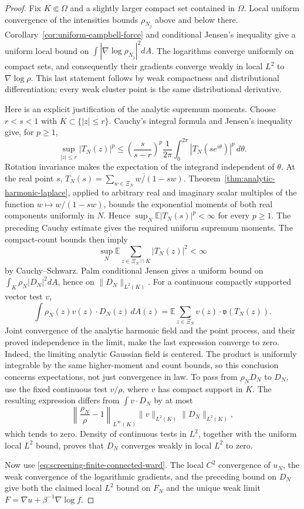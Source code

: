 \documentclass[11pt,a4paper]{article}
\numberwithin{equation}{section}
\theoremstyle{definition}
\theoremstyle{remark}
\begin{document}
\begin{proof}
Fix $K\Subset\Omega$ and a slightly larger compact set contained in
$\Omega$. Local uniform convergence of the intensities bounds
$\rho_{N_j}$ above and below there. Corollary~\ref{cor:uniform-campbell-force} and conditional
Jensen's inequality give a uniform local bound on
$\int |\nabla\log\rho_{N_j}|^2dA$. The logarithms converge uniformly
on compact sets, and consequently their gradients converge weakly in
local $L^2$ to $\nabla\log\rho$. This last statement follows by weak
compactness and distributional differentiation; every weak cluster
point is the same distributional derivative.

Here is an explicit justification of the analytic supremum moments.
Choose $r<s<1$ with $K\subset\{|z|\le r\}$. Cauchy's integral
formula and Jensen's inequality give, for $p\ge1$,
\[
 \sup_{|z|\le r}|T_N(z)|^p
 \le\left(\frac{s}{s-r}\right)^p
          \frac1{2\pi}\int_0^{2\pi}|T_N(se^{i\theta})|^p\,d\theta.
\]
Rotation invariance makes the expectation of the integrand independent
of $\theta$. At the real point $s$,
$T_N(s)=\overline{\sum_{w\in\Xi_N} w/(1-sw)}$.
Theorem~\ref{thm:analytic-harmonic-laplace}, applied to arbitrary real
and imaginary scalar multiples of the function $w\mapsto w/(1-sw)$,
bounds the exponential moments of both real components uniformly in
$N$. Hence $\sup_N\mathbb E|T_N(s)|^p<\infty$ for every $p\ge1$.
The preceding Cauchy estimate gives the required uniform supremum
moments. The compact-count bounds then imply
\[
 \sup_N\mathbb E\sum_{z\in\Xi_N\cap K}|T_N(z)|^2<\infty
\]
by Cauchy--Schwarz. Palm conditional Jensen gives a uniform bound on
$\int_K\rho_N|D_N|^2dA$, hence on $\|D_N\|_{L^2(K)}$.
For a continuous compactly supported vector test $v$,
\[
 \int\rho_N(z)v(z)\cdot D_N(z)\,dA(z)
 =\mathbb E\sum_{z\in\Xi_N}v(z)\cdot\mathfrak v(T_N(z)).
\]
Joint convergence of the analytic harmonic field and the point process,
and their proved independence in the limit, make the last expression
converge to zero. Indeed, the limiting analytic Gaussian field is
centered. The product is uniformly integrable by the same higher-moment
and count bounds, so this conclusion concerns expectations, not just
convergence in law. To pass from $\rho_ND_N$ to $D_N$, use the fixed
continuous test $v/\rho$, where $v$ has compact support in $K$. The
resulting expression differs from $\int v\cdot D_N$ by at most
\[
 \left\|\frac{\rho_N}{\rho}-1\right\|_{L^\infty(K)}
      \|v\|_{L^2(K)}\|D_N\|_{L^2(K)},
\]
which tends to zero. Density of continuous tests in $L^2$, together
with the uniform local $L^2$ bound, proves that $D_N$ converges weakly
in local $L^2$ to zero.

Now use \eqref{eq:screening-finite-connected-ward}. The local $C^2$
convergence of $u_N$, the weak convergence of the logarithmic gradients,
and the preceding bound on $D_N$ give both the claimed local $L^2$
bound on $F_N$ and the unique weak limit
$F=\nabla u+\beta^{-1}\nabla\log f$.
\end{proof}
\end{document}

